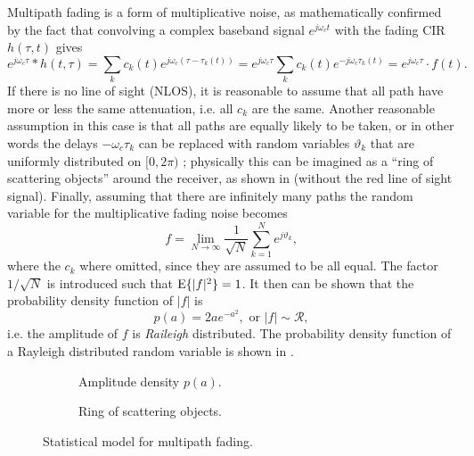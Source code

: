Multipath fading is a form of multiplicative noise, as mathematically confirmed by the fact that convolving a complex baseband signal \(e^{j\omega_c t}\) with the fading CIR \(h(\tau, t)\) gives
\begin{equation}
	e^{j\omega_c \tau} * h(t, \tau) = \sum_k c_k(t) e^{j\omega_c(\tau - \tau_k(t))}
	= e^{j\omega_c \tau} \sum_k c_k(t) e^{-j\omega_c \tau_k(t)}
	= e^{j\omega_c \tau} \cdot f(t).
\end{equation}
If there is no line of sight (NLOS), it is reasonable to assume that all path have more or less the same attenuation, i.e. all \(c_k\) are the same. Another reasonable assumption in this case is that all paths are equally likely to be taken, or in other words the delays \(-\omega_c \tau_k\) can be replaced with random variables \(\vartheta_k\) that are uniformly distributed on \([0,2\pi)\) \cite{Hoher2013,Mathis}; physically this can be imagined as a ``ring of scattering objects'' around the receiver\cite{Messier}, as shown in  (without the red line of sight signal). Finally, assuming that there are infinitely many paths the random variable for the multiplicative fading noise becomes
\begin{equation} \label{eqn:mult-fading-nlos}
	f = \lim_{N\rightarrow\infty} \frac{1}{\sqrt{N}}
		\sum_{k=1}^{N} e^{j \vartheta_k },
\end{equation}
where the \(c_k\) where omitted, since they are assumed to be all equal. The factor \(1/\sqrt{N}\) is introduced such that \(\operatorname{E} \{|f|^2\} = 1\). It then can be shown that the probability density function of \(|f|\) is
\begin{equation}
	p(a)= 2a e^{-a^2}, \text{ or } |f| \sim \mathcal{R},
\end{equation}
i.e. the amplitude of \(f\) is \emph{Raileigh} distributed. The probability density function of a Rayleigh distributed random variable is shown in .

\begin{figure}
	\centering
	\hfill
	\begin{subfigure}[t]{.5\linewidth}
		
		\caption{
			Amplitude density \(p(a)\).
			\label{fig:rayleigh-rice-pdf}
		}
	\end{subfigure}
	\hfill
	\begin{subfigure}[t]{.45\linewidth}
		\centering
		\resizebox{!}{5cm}{%
			
		}
		\caption{
			Ring of scattering objects.
			\label{fig:ring-of-scattering-objects}
		}
	\end{subfigure}
	\hfill
	\caption{
		Statistical model for multipath fading.
		\label{fig:multipath-statistical-models}
	}
\end{figure}

